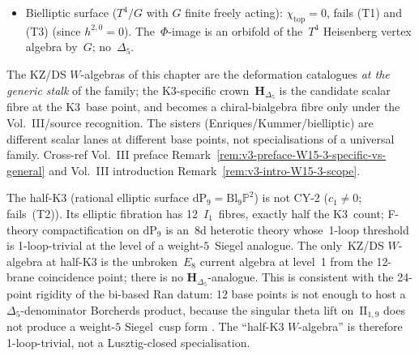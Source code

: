 \begin{remark}
\begin{itemize}
 $\Phi$-image with $\mathbf{H}_{\Delta_5}$ restricted to the Kummer
 sublattice~$\Lambda_{\mathrm{Kum}}\subset \mathrm{II}_{3,19}$
 requires the Vol.~III/source recognition of $\mathbf{H}_{\Delta_5}$
 and a chain-compatible Kummer sublattice comparison.
\item Bielliptic surface ($T^4/G$ with $G$ finite freely acting):
 $\chi_{\mathrm{top}} = 0$, fails (T1) and (T3) (since $h^{2,0} = 0$).
 The~$\Phi$-image is an orbifold of the~$T^4$ Heisenberg vertex
 algebra by~$G$; no~$\Delta_5$.
\end{itemize}
The KZ/DS $W$-algebras of this chapter are the deformation
catalogues \emph{at the generic stalk} of the family; the
K3-specific crown~$\mathbf{H}_{\Delta_5}$ is the candidate scalar fibre
at the K3~base point, and becomes a chiral-bialgebra fibre only under
the Vol.~III/source recognition. The sisters
(Enriques/Kummer/bielliptic) are different scalar lanes at different
base points, not specialisations of a universal family. Cross-ref Vol.~III preface
Remark~\ref{rem:v3-preface-W15-3-specific-vs-general} and
Vol.~III introduction
Remark~\ref{rem:v3-intro-W15-3-scope}.
\end{remark}

\begin{remark}[Half-K3 $= \mathrm{dP}_9$ is not CY-2; 12 fibres, not 24]
\label{rem:wac-W15-2-halfK3}
The half-K3 (rational elliptic surface
$\mathrm{dP}_9 = \mathrm{Bl}_9\mathbb{P}^2$) is not CY-2
($c_1\ne 0$; fails~(T2)). Its elliptic fibration has 12~$I_1$~fibres,
exactly half the K3~count; F-theory compactification on
$\mathrm{dP}_9$ is an~8d heterotic theory whose~1-loop threshold is
1-loop-trivial at the level of a weight-$5$~Siegel analogue.
The only~KZ/DS $W$-algebra at half-K3 is the
unbroken~$E_8$ current algebra at level~1 from the 12-brane
coincidence point; there is no $\mathbf{H}_{\Delta_5}$-analogue.
This is consistent with the 24-point rigidity of the bi-based Ran
datum: 12 base points is not enough to host a $\Delta_5$-denominator
Borcherds product, because the singular theta lift
on~$\mathrm{II}_{1,9}$ does not produce a weight-$5$ Siegel~cusp form
\cite{MorrisonVafa1996II,Borcherds1998}. The ``half-K3
$W$-algebra'' is therefore 1-loop-trivial, not a Lusztig-closed
specialisation.
\end{remark}

